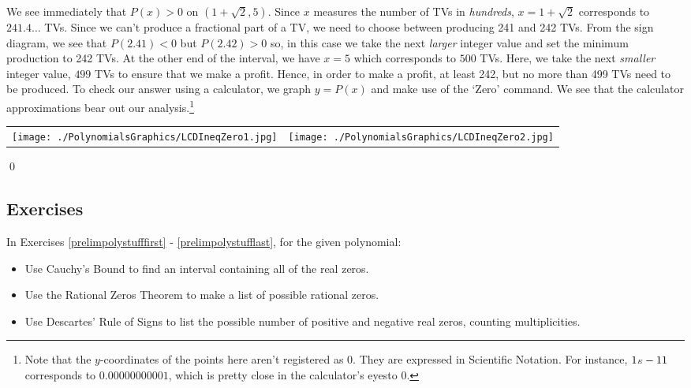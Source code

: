 \begin{ex}
We see immediately that $P(x)>0$ on $(1+\sqrt{2},5)$.  Since $x$ measures the number of TVs in \textit{hundreds}, $x = 1 + \sqrt{2}$ corresponds to $241.4\ldots$ TVs.  Since we can't produce a fractional part of a TV, we need to choose between producing 241 and 242 TVs.  From the sign diagram, we see that $P(2.41) < 0$ but $P(2.42)>0$ so, in this case we take the next \textit{larger} integer value and set the minimum production to 242 TVs.  At the other end of the interval, we have $x=5$ which corresponds to $500$ TVs.  Here, we take the next \textit{smaller} integer value, $499$ TVs to ensure that we make a profit.  Hence, in order to make a profit, at least 242, but no more than 499 TVs need to be produced.  To check our answer using a calculator, we graph $y=P(x)$ and make use of the `Zero' command. We see that the calculator approximations bear out our analysis.\footnote{Note that the $y$-coordinates of the points here aren't registered as $0$.  They are expressed in Scientific Notation.  For instance, $1 \mbox{\tiny $E$} -11$ corresponds to $0.00000000001$, which is pretty close in the calculator's eyes\footnotemark to $0$.}   

\begin{center}

\begin{tabular}{cc}

\texttt{[image: ./PolynomialsGraphics/LCDIneqZero1.jpg]} \hspace{0.75in} & \texttt{[image: ./PolynomialsGraphics/LCDIneqZero2.jpg]}

\end{tabular}

\end{center}   \qed

\end{ex}

\newpage

\subsection{Exercises}


In Exercises \ref{prelimpolystufffirst} - \ref{prelimpolystufflast}, for the given polynomial:

\begin{itemize}
\item  Use Cauchy's Bound to find an interval containing all of the real zeros.
\item  Use the Rational Zeros Theorem to make a list of possible rational zeros.
\item  Use Descartes' Rule of Signs to list the possible number of positive and negative real zeros, counting multiplicities.
\end{itemize}



